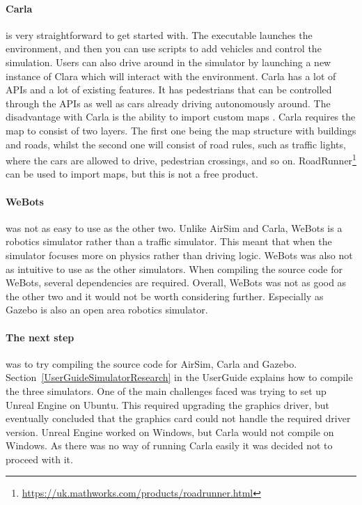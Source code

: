 \paragraph{Carla} is very straightforward to get started with. The executable launches the environment, and then you can use scripts to add vehicles and control the simulation. Users can also drive around in the simulator by launching a new instance of Clara which will interact with the environment. Carla has a lot of APIs and a lot of existing features. It has pedestrians that can be controlled through the APIs as well as cars already driving autonomously around.  The disadvantage with Carla is the ability to import custom maps \cite{Carlamap}. Carla requires the map to consist of two layers. The first one being the map structure with buildings and roads, whilst the second one will consist of road rules, such as traffic lights, where the cars are allowed to drive, pedestrian crossings, and so on. RoadRunner\footnote{\url{https://uk.mathworks.com/products/roadrunner.html}} can be used to import maps, but this is not a free product.

\paragraph{WeBots} was not as easy to use as the other two. Unlike AirSim and Carla, WeBots is a robotics simulator rather than a traffic simulator. This meant that when the simulator focuses more on physics rather than driving logic. WeBots was also not as intuitive to use as the other simulators. When compiling the source code for WeBots, several dependencies are required. Overall, WeBots was not as good as the other two and it would not be worth considering further. Especially as Gazebo is also an open area robotics simulator. 

\paragraph{The next step} was to try compiling the source code for AirSim, Carla and Gazebo. Section~\ref{UserGuideSimulatorResearch} in the UserGuide explains how to compile the three simulators. One of the main challenges faced was trying to set up Unreal Engine on Ubuntu. This required upgrading the graphics driver, but eventually concluded that the graphics card could not handle the required driver version. Unreal Engine worked on Windows, but Carla would not compile on Windows. As there was no way of running Carla easily it was decided not to proceed with it. 

